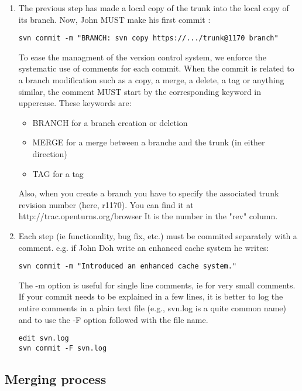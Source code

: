 \begin{itemize}
\begin{enumerate}
\item The previous step has made a local copy of the trunk into the local copy of its branch. Now, John MUST make his first commit :

\begin{lstlisting}
svn commit -m "BRANCH: svn copy https://.../trunk@1170 branch"
\end{lstlisting}

To ease the managment of the version control system, we enforce the systematic use of comments for each commit. When the commit is related to a branch modification such as a copy, a merge, a delete, a tag or anything similar, the comment MUST start by the corresponding keyword in uppercase. These keywords are:

\begin{itemize}
\item BRANCH for a branch creation or deletion
\item MERGE for a merge between a branche and the trunk (in either direction)
\item TAG for a tag
\end{itemize}
Also, when you create a branch you have to specify the associated trunk revision number (here, r1170). You can find it at http://trac.openturns.org/browser
It is the number in the "rev" column.


\item Each step (ie functionality, bug fix, etc.) must be commited separately with a comment. e.g. if John Doh write an enhanced cache system he writes:

\begin{lstlisting}
svn commit -m "Introduced an enhanced cache system."
\end{lstlisting}

The -m option is useful for single line comments, ie for very small comments. If your commit needs to be explained in a few lines, it is better to log the entire comments in a plain text file (e.g., svn.log is a quite common name) and to use the -F option followed with the file name.
\begin{lstlisting}
edit svn.log
svn commit -F svn.log
\end{lstlisting}

\end{enumerate}
\end{itemize}


\subsection{Merging process}

